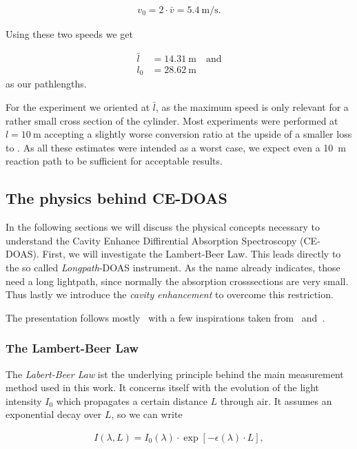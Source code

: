 \begin{align*}
  v_0 = 2\cdot \bar v = \SI{5.4}{\meter\per\second}.
\end{align*}

Using these two speeds we get

\begin{align*}
  \bar l & = \SI{14.31}{\meter} \quad \text{and}\\
  l_0 & = \SI{28.62}{\meter}
\end{align*}
as our pathlengths.

For the experiment we oriented at $\bar l$, as the maximum speed is
only relevant for a rather small cross section of the
cylinder. Most experiments were performed at $l = \SI{10}{\meter}$
accepting a slightly worse  conversion ratio at the upside of a
smaller loss to . As all these estimates were intended as a
worst case, we expect even a \SI{10}{\meter} reaction path to be
sufficient for acceptable results.

\subsection{The physics behind CE-DOAS}
\label{sec:ce-doas-physics}

In the following sections we will discuss the physical concepts
necessary to understand the Cavity Enhance Diffirential Absorption
Spectroscopy (CE-DOAS). First, we will investigate the Lambert-Beer
Law. This leads directly to the so called \emph{Longpath}-DOAS
instrument. As the name already indicates, those need a long
lightpath, since normally the absorption crosssections are very
small. Thus lastly we introduce the \emph{cavity enhancement} to
overcome this restriction.

The presentation follows mostly~\cite{fp58} with a few inspirations
taken from~\cite{bsc} and~\cite{platt}.

\subsubsection{The Lambert-Beer Law}
\label{sec:lambert-beer}

The \emph{Labert-Beer Law} ist the underlying principle behind the
main measurement method used in this work. It concerns itself with the
evolution of the light intensity $I_0$ which propagates a certain
distance $L$ through air. It assumes an exponential decay over $L$, so
we can write

\begin{align}
  I(\lambda, L) = I_0(\lambda) \cdot \exp[-\epsilon(\lambda) \cdot
  L], \label{eq:lb-easy}
\end{align}


